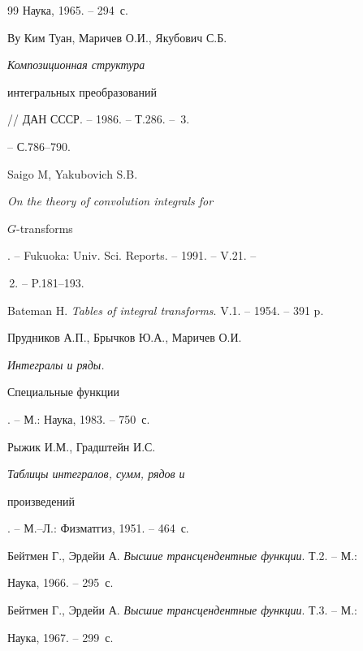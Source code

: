 \begin{thebibliography}{99}
Наука, 1965. -- 294~с.




Ву Ким Туан, Маричев О.И., Якубович С.Б. {\em Композиционная структура


интегральных преобразований} // ДАН СССР. -- 1986. -- Т.286. -- \No\,3.


-- С.786--790.




Saigo M, Yakubovich S.B. {\em On the theory of convolution integrals for


$G$-transforms}. -- Fukuoka: Univ. Sci. Reports. -- 1991. -- V.21. --


\No\,2. -- P.181--193.




Bateman H. {\em Tables of integral transforms}. V.1. -- 1954. -- 391 p.




Прудников А.П., Брычков Ю.А., Маричев О.И. {\em Интегралы и ряды.


Специальные функции}. -- М.: Наука, 1983. -- 750~с.




Рыжик И.М., Градштейн И.С. {\em Таблицы интегралов, сумм, рядов и


произведений}. -- М.--Л.: Физматгиз, 1951. -- 464~с.




Бейтмен Г., Эрдейи А. {\em Высшие трансцендентные функции}. Т.2. -- М.:


Наука, 1966. -- 295~с.




Бейтмен Г., Эрдейи А. {\em Высшие трансцендентные функции}. Т.3. -- М.:


Наука, 1967. -- 299~с.








\end{thebibliography}





\vskip 2cm















